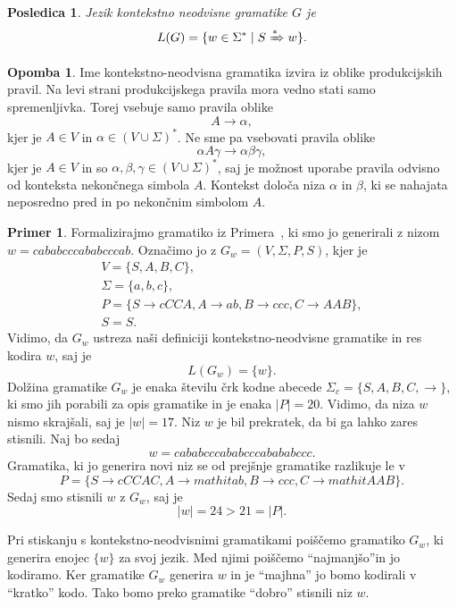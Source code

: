 \documentclass{amsart}
\theoremstyle{definition}
\newtheorem{primer}[definicija]{Primer}
\newtheorem{opomba}[definicija]{Opomba}
\theoremstyle{plain} %
\newtheorem{posledica}[definicija]{Posledica}
\begin{document}
\begin{posledica}

    Jezik kontekstno neodvisne gramatike $ G $ je
    \[
        L(G) = \{ w \in \Sigma^* \mid S \xRightarrow{*} w \}.
    \]

\end{posledica}

\begin{opomba}
    
    Ime kontekstno-neodvisna gramatika izvira iz oblike produkcijskih pravil. Na levi
    strani produkcijskega pravila mora vedno stati samo spremenljivka. Torej vsebuje samo
    pravila oblike
    \[
        A \rightarrow \alpha,
    \]
    kjer je  $ A \in V $ in $ \alpha \in ( V \cup \Sigma )^* $. Ne sme pa vsebovati
    pravila oblike
    \[
        \alpha A \gamma \rightarrow \alpha\beta\gamma,
    \]
    kjer je $ A \in V $ in so $ \alpha, \beta, \gamma \in ( V \cup \Sigma )^* $, saj je možnost uporabe
    pravila odvisno od konteksta nekončnega simbola $ A $. Kontekst določa niza $ \alpha $ in $ \beta $,
    ki se nahajata neposredno pred in po nekončnim simbolom $ A $.

\end{opomba}

\begin{primer}
    
    Formalizirajmo gramatiko iz Primera~, ki smo jo generirali z nizom
    $ w = \mathit{cababcccababcccab} $. Označimo jo z $ G_w = ( V, \Sigma, P, S ) $, kjer je 
    \begin{gather*}
        V = \{ S, A, B, C \}, \\
        \Sigma = \{ a, b, c \}, \\
        P = \{ S  \rightarrow  \mathit{cCCA}, A  \rightarrow  \mathit{ab}, B  
        \rightarrow  \mathit{ccc}, C  \rightarrow  \mathit{AAB} \}, \\
        S = S.
    \end{gather*}
    Vidimo, da $ G_w $ ustreza naši definiciji kontekstno-neodvisne gramatike
    in res kodira $ w $, saj je 
    \[
        L(G_w) = \{w\}.
    \]
    Dolžina gramatike $ G_w $ je enaka številu črk kodne abecede $ \Sigma_c = \{ S, A, B, C, \rightarrow \} $,
    ki smo jih porabili za opis gramatike in je enaka $ |P| = 20 $. Vidimo, da niza $ w $ 
    nismo skrajšali, saj je $ |w| = 17 $. Niz $ w $ je bil prekratek, da bi ga lahko
    zares stisnili. Naj bo sedaj
    \[
        w =   \mathit{cababcccababcccabababccc}.
    \]
    Gramatika, ki jo generira novi niz se od prejšnje gramatike razlikuje le v
    \[
        P = \{ S  \rightarrow  \mathit{cCCAC}, A  \rightarrow  mathit{ab}, B  
        \rightarrow  \mathit{ccc}, C  \rightarrow  mathit{AAB} \}.
    \]
    Sedaj smo stisnili $ w $ z $ G_w $, saj je
    \[
        |w| = 24 > 21 = |P|.
    \]

\end{primer}

Pri stiskanju s kontekstno-neodvisnimi gramatikami poiščemo gramatiko $ G_w $, ki generira
enojec $ \{ w \} $ za svoj jezik. Med njimi poiščemo ``najmanjšo''in jo kodiramo.
Ker gramatike $ G_w $ generira $ w $ in je ``majhna'' jo bomo kodirali v ``kratko'' kodo.
Tako bomo preko gramatike ``dobro'' stisnili niz $ w $.
\end{document}

